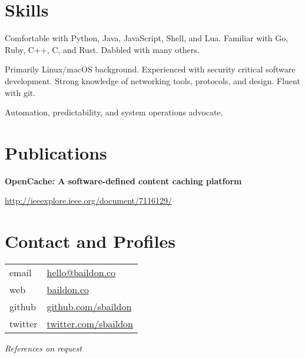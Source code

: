 \documentclass[a4paper,12pt]{article}
\begin{document}
\begin{multicols*}{2}
\section*{Skills}
Comfortable with Python, Java, JavaScript, Shell, and Lua. Familiar with Go, Ruby, C++, C, and Rust. Dabbled with many others.\medskip

Primarily Linux/macOS background. Experienced with security critical software development. Strong knowledge of networking tools, protocols, and design.  Fluent with git.\medskip

Automation, predictability, and system operations advocate.

\section*{Publications}
\textbf{OpenCache: A software-defined content caching platform}\par
\url{http://ieeexplore.ieee.org/document/7116129/}

\section*{Contact and Profiles}
\noindent \begin{tabular}{@{}ll}
email & \href{mailto:hello@baildon.co}{hello@baildon.co} \\
web & \href{https://baildon.co}{baildon.co} \\
github & \href{https://github.com/sbaildon}{github.com/sbaildon} \\
twitter & \href{https://twitter.com/sbaildon}{twitter.com/sbaildon}
\end{tabular}

\vspace{4ex}
\textit{References on request}

\end{multicols*}
\end{document}
